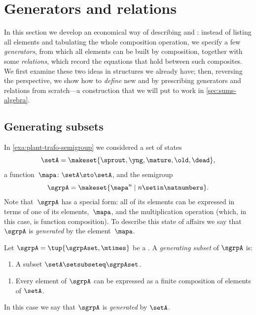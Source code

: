 
\section{Generators and relations}
\label{sec:generators-relations-algebra}


In this section we develop an economical way of describing  and : instead of listing all elements and tabulating the whole composition operation, we specify a few \emph{generators}, from which all elements can be built by composition, together with some \emph{relations}, which record the equations that hold between such composites.
We first examine these two ideas in structures we already have; then, reversing the perspective, we show how to \emph{define} new  and  by prescribing generators and relations from scratch---a construction that we will put to work in \cref{sec:sums-algebra}.

\subsection{Generating subsets}

In \cref{exa:plant-trafo-semigroup} we considered a set of states
%
\begin{equation}
    \setA= \makeset{ \sprout, \yng, \mature, \old, \dead },
\end{equation}
%
a function~$\mapa \colon \setA \sto \setA$, and the semigroup
%
\begin{equation}
    \label{eq:trafo-sgrp-one-gen}
    \sgrpA = \makeset{ \mapa^n \mid n \setin \natnumbers }.
\end{equation}
%
Note that~$\sgrpA$ has a special form: all of its elements can be expressed in terms of one of its elements,~$\mapa$, and the multiplication operation (which, in this case, is function composition).
To describe this state of affairs we say that~$\sgrpA$ is \emph{generated} by the element~$\mapa$.

\begin{ctdefinition}
    \label{def:gen-semigrp}
    Let $\sgrpA = \tup{\sgrpAset, \mtimes}$ be a .
    A \emph{generating subset} of $\sgrpA$ is:

    \constit
    \begin{enumerate}
        \item A subset $\setA \setsubseteq \sgrpAset$.
    \end{enumerate}

    \condit
    \begin{enumerate}
        \item Every element of $\sgrpA$ can be expressed as a finite composition of elements of $\setA$.
    \end{enumerate}
    In this case we say that $\sgrpA$ is \emph{generated} by $\setA$.
\end{ctdefinition}

